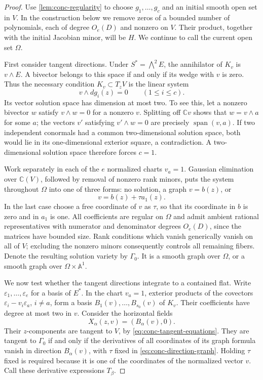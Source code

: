 \begin{proof}
Use \cref{lem:conc-regularity} to choose $g_1,\ldots,g_c$ and an initial smooth open set in $V$.  In the construction below we remove zeros of a bounded number of polynomials, each of degree $O_e(D)$ and nonzero on $V$.  Their product, together with the initial Jacobian minor, will be $H$.  We continue to call the current open set $\Omega$.

First consider tangent directions.  Under $S^*=\bigwedge^2E$, the annihilator of $K_v$ is $v\wedge E$.  A bivector belongs to this space if and only if its wedge with $v$ is zero.  Thus the necessary condition $K_v\subset T_zV$ is the linear system
\begin{equation}
 v\wedge dg_i(z)=0\qquad(1\leq i\leq c).
 \label{eq:conc-tangent-equations}
\end{equation}
Its vector solution space has dimension at most two.  To see this, let a nonzero bivector $w$ satisfy $v\wedge w=0$ for a nonzero $v$. Splitting off $\mathbb{C}v$ shows that $w=v\wedge a$ for some $a$; the vectors $v'$ satisfying $v'\wedge w=0$ are precisely $\operatorname{span}(v,a)$.  If two independent conormals had a common two-dimensional solution space, both would lie in its one-dimensional exterior square, a contradiction.  A two-dimensional solution space therefore forces $c=1$.

Work separately in each of the $e$ normalized charts $v_a=1$. Gaussian elimination over $\mathbb{C}(V)$, followed by removal of nonzero rank minors, puts the system throughout $\Omega$ into one of three forms: no solution, a graph $v=b(z)$, or
\begin{equation}
 v=b(z)+\tau a_1(z).
 \label{eq:conc-direction-graph}
\end{equation}
In the last case choose a free coordinate of $v$ as $\tau$, so that its coordinate in $b$ is zero and in $a_1$ is one.  All coefficients are regular on $\Omega$ and admit ambient rational representatives with numerator and denominator degrees $O_e(D)$, since the matrices have bounded size.  Rank conditions which vanish generically vanish on all of $V$; excluding the nonzero minors consequently controls all remaining fibers.  Denote the resulting solution variety by $\Gamma_0$. It is a smooth graph over $\Omega$, or a smooth graph over $\Omega\times\mathbb{A}^1$.

We now test whether the tangent directions integrate to a contained flat.  Write $\varepsilon_1,\ldots,\varepsilon_e$ for a basis of $E^*$. In the chart $v_a=1$, exterior products of the covectors $\varepsilon_i-v_i\varepsilon_a$, $i\ne a$, form a basis $B_1(v),\ldots,B_{s_0}(v)$ of $K_v$.  Their coefficients have degree at most two in $v$.  Consider the horizontal fields
\[
 X_\alpha(z,v)=(B_\alpha(v),0).
\]
Their $z$-components are tangent to $V$, by \eqref{eq:conc-tangent-equations}.  They are tangent to $\Gamma_0$ if and only if the derivatives of all coordinates of its graph formula vanish in direction $B_\alpha(v)$, with $\tau$ fixed in \eqref{eq:conc-direction-graph}.  Holding $\tau$ fixed is required because it is one of the coordinates of the normalized vector $v$. Call these derivative expressions $T_\beta$.


\end{proof}
